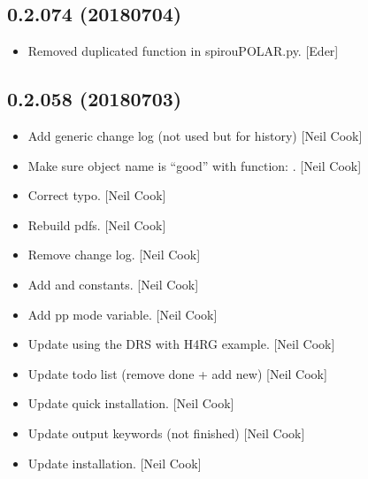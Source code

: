 \documentclass[a4paper,10pt,english]{report}
\begin{document}
\subsection{0.2.074 (2018\sphinxhyphen{}07\sphinxhyphen{}04)}
\label{\detokenize{misc/changelog:id421}}\begin{itemize}
\item {} 
Removed duplicated function  in spirouPOLAR.py.
{[}Eder{]}

\end{itemize}


\subsection{0.2.058 (2018\sphinxhyphen{}07\sphinxhyphen{}03)}
\label{\detokenize{misc/changelog:id422}}\begin{itemize}
\item {} 
Add generic change log (not used but for history) {[}Neil Cook{]}

\item {} 
Make sure object name is “good” with function: .
{[}Neil Cook{]}

\item {} 
Correct typo. {[}Neil Cook{]}

\item {} 
Rebuild pdfs. {[}Neil Cook{]}

\item {} 
Remove change log. {[}Neil Cook{]}

\item {} 
Add  and  constants. {[}Neil Cook{]}

\item {} 
Add pp mode variable. {[}Neil Cook{]}

\item {} 
Update using the DRS with H4RG example. {[}Neil Cook{]}

\item {} 
Update todo list (remove done + add new) {[}Neil Cook{]}

\item {} 
Update quick installation. {[}Neil Cook{]}

\item {} 
Update output keywords (not finished) {[}Neil Cook{]}

\item {} 
Update installation. {[}Neil Cook{]}


\end{itemize}
\end{document}
